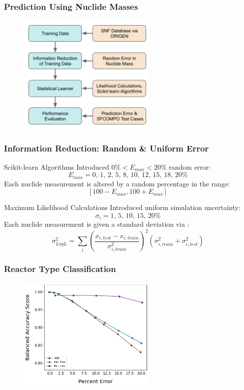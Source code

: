 
\begin{frame}
  \frametitle{Prediction Using Nuclide Masses}
  \begin{figure}
    \centering
    \includegraphics[width=0.6\textwidth]{./figures/methodology1.png}
  \end{figure}
\end{frame}

\begin{frame}
  \frametitle{Information Reduction: Random \& Uniform Error}
  \begin{block}{Scikit-learn Algorithms}
    \small
    Introduced $0\% < E_{max} < 20\%$ random error:
    \[E_{max} = \text{0, 1, 2, 5, 8, 10, 12, 15, 18, 20}\% \]
    Each nuclide measurement is altered by a random percentage in the range: 
    \[[100-E_{max},100+E_{max}]\]
  \end{block}
  \begin{block}{Maximum Likelihood Calculations}
  \small
    Introduced uniform simulation uncertainty: 
    \[\sigma_i = \text{1, 5, 10, 15, 20}\% \]
    Each nuclide measurement is given a standard deviation via 
    \cite{mll_sensitivity}:
    \[\sigma_{Log L}^2 = \sum_i \left( 
                                \frac{x_{i,test} - x_{i,train}}{\sigma_{i,train}^2}
                                \right)^2 
                                (\sigma_{i,train}^2 + \sigma_{i,test}^2)
    \]
  \end{block}
\end{frame}

\begin{frame}
  \frametitle{Reactor Type Classification}
    \begin{figure}
      \centering
      \includegraphics[width=0.6\textwidth]{./figures/randerr_compare_nuc29_BalAcc_rxtr.png}
    \end{figure}
\end{frame}

